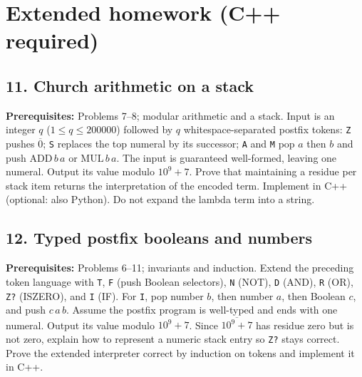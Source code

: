 \documentclass[12pt]{article}
\begin{document}
\section{Extended homework (C++ required)}

\subsection*{11. Church arithmetic on a stack}
\textbf{Prerequisites:} Problems 7--8; modular arithmetic and a stack.
Input is an integer $q$ ($1\le q\le 200000$) followed by $q$ whitespace-separated postfix tokens: \texttt{Z} pushes $\overline0$; \texttt{S} replaces the top numeral by its successor; \texttt{A} and \texttt{M} pop $a$ then $b$ and push $\mathrm{ADD}\,b\,a$ or $\mathrm{MUL}\,b\,a$. The input is guaranteed well-formed, leaving one numeral. Output its value modulo $10^9+7$. Prove that maintaining a residue per stack item returns the interpretation of the encoded term. Implement in C++ (optional: also Python). Do not expand the lambda term into a string.

\subsection*{12. Typed postfix booleans and numbers}
\textbf{Prerequisites:} Problems 6--11; invariants and induction.
Extend the preceding token language with \texttt{T}, \texttt{F} (push Boolean selectors), \texttt{N} (NOT), \texttt{D} (AND), \texttt{R} (OR), \texttt{Z?} (ISZERO), and \texttt{I} (IF). For \texttt{I}, pop number $b$, then number $a$, then Boolean $c$, and push $c\,a\,b$. Assume the postfix program is well-typed and ends with one numeral. Output its value modulo $10^9+7$. Since $\overline{10^9+7}$ has residue zero but is not zero, explain how to represent a numeric stack entry so \texttt{Z?} stays correct. Prove the extended interpreter correct by induction on tokens and implement it in C++.
\end{document}
